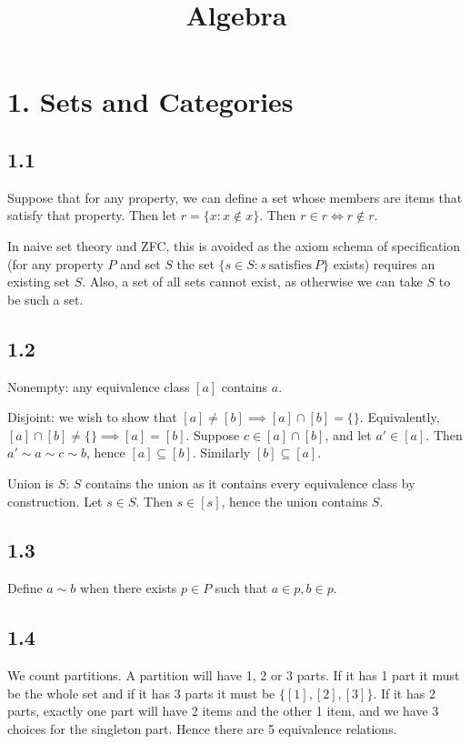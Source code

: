 \documentclass{article}
\title{Algebra}
\date{}
\begin{document}
\maketitle

\section*{1. Sets and Categories}

\subsection*{1.1}

Suppose that for any property, we can define a set whose members are items that satisfy that property. Then let $r = \{x : x \not\in x\}$. Then $r \in r \iff r \not\in r$.

In naive set theory and ZFC, this is avoided as the axiom schema of specification (for any property $P$ and set $S$ the set $\{s \in S : s\ \text{satisfies}\ P\}$ exists) requires an existing set $S$. Also, a set of all sets cannot exist, as otherwise we can take $S$ to be such a set.

\subsection*{1.2}

Nonempty: any equivalence class $[a]$ contains $a$.

Disjoint: we wish to show that $[a] \ne [b] \implies [a] \cap [b] = \{\}$. Equivalently, $[a] \cap [b] \ne \{\} \implies [a] = [b]$. Suppose $c \in [a] \cap [b]$, and let $a' \in [a]$. Then $a' \sim a \sim c \sim b$, hence $[a] \subseteq [b]$. Similarly $[b] \subseteq [a]$.

Union is $S$: $S$ contains the union as it contains every equivalence class by construction. Let $s \in S$. Then $s \in [s]$, hence the union contains $S$.

\subsection*{1.3}

Define $a \sim b$ when there exists $p \in P$ such that $a \in p, b \in p$.

\subsection*{1.4}

We count partitions. A partition will have 1, 2 or 3 parts. If it has 1 part it must be the whole set and if it has 3 parts it must be $\{[1], [2], [3]\}$. If it has 2 parts, exactly one part will have 2 items and the other 1 item, and we have 3 choices for the singleton part. Hence there are 5 equivalence relations.
\end{document}
